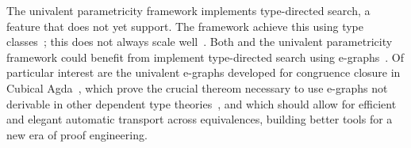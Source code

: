 The univalent parametricity framework implements type-directed search, a feature that \toolname does not yet support.
The framework achieve this using type classes~\cite{Sozeau2008}; this does not always scale well~\cite{tabareau2019marriage}.
Both \toolname and the univalent parametricity framework could benefit from implement type-directed search using e-graphs~\cite{egraph1}.
Of particular interest are the univalent e-graphs developed for congruence closure in Cubical Agda~\cite{egraph6},
which prove the crucial thereom necessary to use e-graphs not derivable in other dependent type theories~\cite{egraph7},
and which should allow for efficient and elegant automatic transport across equivalences, building better tools for a new era of
proof engineering.




